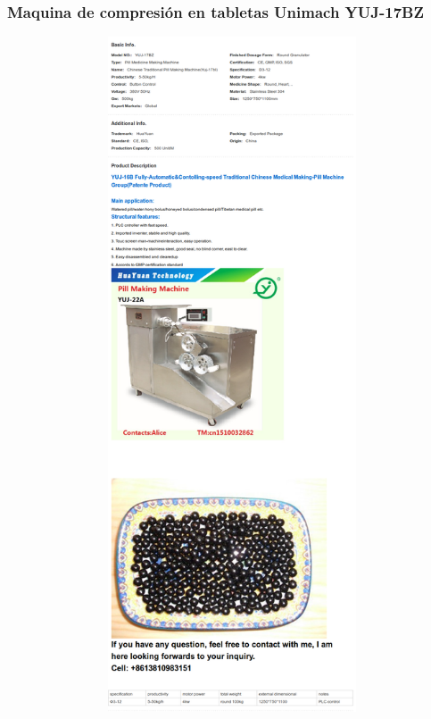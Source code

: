 \subsubsection{Maquina de compresión en tabletas Unimach YUJ-17BZ}
\includegraphics[width=15cm,height=20cm,keepaspectratio]{Datasheets/2MaquinaPrensado.png} 
\newpage


